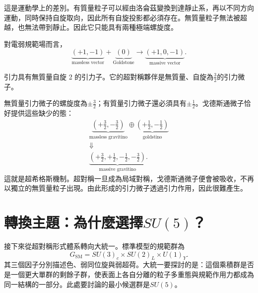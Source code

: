 這是運動學上的差別。有質量粒子可以經由洛侖茲變換到達靜止系，再以不同方向運動，同時保持自旋取向，因此所有自旋投影都必須存在。無質量粒子無法被超越，也無法帶到靜止。因此它只能具有兩種極端螺旋度。

對電弱規範場而言，
\begin{equation}
\underbrace{(+1,-1)}_{\text{massless vector}}
+
\underbrace{(0)}_{\text{Goldstone}}
\longrightarrow
\underbrace{(+1,0,-1)}_{\text{massive vector}}.
\label{eq:l9-higgs-count}
\end{equation}

\begin{classroomqa}
\end{classroomqa}

引力具有無質量自旋 2 的引力子。它的超對稱夥伴是無質量、自旋為\(\tfrac32\)的引力微子。

\begin{classroomqa}
\end{classroomqa}

無質量引力微子的螺旋度為\(\pm\tfrac32\)；有質量引力微子還必須具有\(\pm\tfrac12\)。戈德斯通微子恰好提供這些缺少的態：
\begin{equation}
\begin{gathered}
\underbrace{\left(+\frac32,-\frac32\right)}_{\text{massless gravitino}}
\oplus
\underbrace{\left(+\frac12,-\frac12\right)}_{\text{goldstino}}\\
\Downarrow\\
\underbrace{\left(+\frac32,+\frac12,-\frac12,-\frac32\right)}_{\text{massive gravitino}}.
\end{gathered}
\label{eq:l9-super-higgs}
\end{equation}
這就是超希格斯機制。超對稱一旦成為局域對稱，戈德斯通微子便會被吸收，不再以獨立的無質量粒子出現。由此形成的引力微子透過引力作用，因此很難產生。

\section{轉換主題：為什麼選擇\texorpdfstring{\(SU(5)\)}{SU(5)}？}

接下來從超對稱形式體系轉向大統一。標準模型的規範群為
\begin{equation}
G_{\mathrm{SM}}
=SU(3)_c\times SU(2)_L\times U(1)_Y.
\label{eq:l9-sm-group}
\end{equation}
其三個因子分別描述色、弱同位旋與弱超荷。大統一要探討的是：這個乘積群是否是一個更大單群的剩餘子群，使表面上各自分離的粒子多重態與規範作用力都成為同一結構的一部分。此處要討論的最小候選群是\(SU(5)\)。

